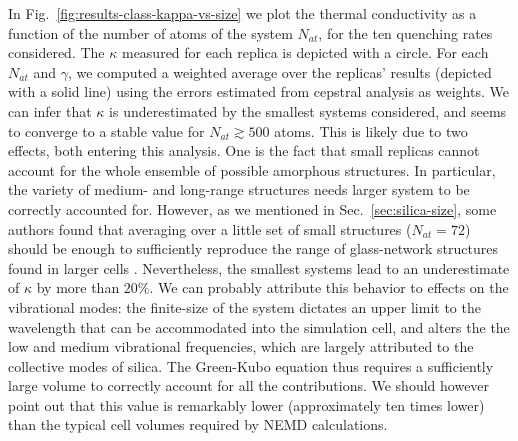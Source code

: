 In Fig.~\ref{fig:results-class-kappa-vs-size} we plot the thermal conductivity as a function of the number of atoms of the system $N_{at}$, for the ten quenching rates considered. 
The $\kappa$ measured for each replica is depicted with a circle. 
For each $N_{at}$ and $\gamma$, we computed a weighted average over the replicas' results (depicted with a solid line) using the errors estimated from cepstral analysis as weights. 
We can infer that $\kappa$ is underestimated by the smallest systems considered, and seems to converge to a stable value for $N_{at}\gtrsim 500$ atoms. 
This is likely due to two effects, both entering this analysis. 
One is the fact that small replicas cannot account for the whole ensemble of possible amorphous structures. In particular, the variety of medium- and long-range structures needs larger system to be correctly accounted for. However, as we mentioned in Sec.~\ref{sec:silica-size}, some authors found that averaging over a little set of small structures ($N_{at}=72$) should be enough to sufficiently reproduce the range of glass-network structures found in larger cells \cite{VanGinhoven2005}. 
Nevertheless, the smallest systems lead to an underestimate of $\kappa$ by more than $20\%$. We can probably attribute this behavior to effects on the vibrational modes: the finite-size of the system dictates an upper limit to the wavelength that can be accommodated into the simulation cell, and alters the the low and medium vibrational frequencies, which are largely attributed to the collective modes of silica. The Green-Kubo equation thus requires a sufficiently large volume to correctly account for all the contributions. 
We should however point out that this value is remarkably lower (approximately ten times lower) than the typical cell volumes required by NEMD calculations.

